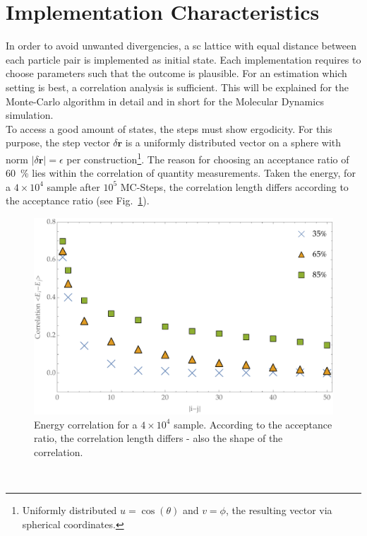 \section{Implementation Characteristics}
In order to avoid unwanted divergencies, a sc lattice with equal distance between each particle pair is implemented as initial state.
Each implementation requires to choose parameters such that the outcome is plausible.
For an estimation which setting is best, a correlation analysis is sufficient.
This will be explained for the Monte-Carlo algorithm in detail and in short for the Molecular Dynamics simulation.\medskip\\
To access a good amount of states, the steps must show ergodicity.
For this purpose, the step vector $\delta \bm r$ is a uniformly distributed vector on a sphere with norm $\left|\delta\bm r\right| = \epsilon$ per construction\footnote{Uniformly distributed $u=\cos(\theta)$ and $v=\phi$, the resulting vector via spherical coordinates.}.
The reason for choosing an acceptance ratio of \SI{60}{\percent} lies within the correlation of quantity measurements.
Taken the energy, for a $4\times10^4$ sample after $10^5$ MC-Steps, the correlation length differs according to the acceptance ratio (see Fig.~\ref{fig:MCCorrSeries}).
\begin{figure}[ht]
	\includegraphics[width=\textwidth]{Figures/MCEnergyCorrelations.pdf}
	\caption[MC: Energy Correlation Series]{Energy correlation for a $4\times10^4$ sample. According to the acceptance ratio, the correlation length differs - also the shape of the correlation.}
	\label{fig:MCCorrSeries}
\end{figure}\\
